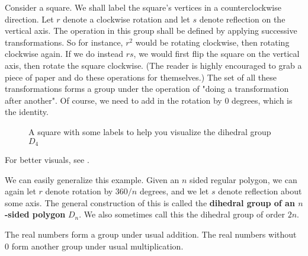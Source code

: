 \documentclass[./main.tex]{subfiles}
\begin{document}
\begin{example}
    Consider a square. We shall label the square's vertices in a
    counterclockwise direction. Let $r$ denote a clockwise rotation and let $s$
    denote reflection on the vertical axis. The operation in this group shall be
    defined by applying successive transformations. So for instance, $r^2$ would
    be rotating clockwise, then rotating clockwise again. If we do instead $rs$,
    we would first flip the square on the vertical axis, then rotate the square
    clockwise. (The reader is highly encouraged to grab a piece of paper and do
    these operations for themselves.) The set of all these transformations forms
    a group under the operation of "doing a transformation after another". Of
    course, we need to add in the rotation by 0 degrees, which is the identity.

    \begin{figure}[h]
        \centering
        \caption{A square with some labels to help you visualize the dihedral group $D_4$}
    \end{figure}

    For better visuals, see \autocite[Fig.~1.1, \pno~28]{Gallian_2020}.

    We can easily generalize this example. Given an $n$ sided regular polygon,
    we can again let $r$ denote rotation by $360/n$ degrees, and we let $s$
    denote reflection about some axis. The general construction of this is
    called the \textbf{dihedral group of an $n$-sided polygon} $D_n$. We also
    sometimes call this the dihedral group of order $2n$.
    
\end{example}

\begin{example}
    The real numbers form a group under usual addition. The real numbers without
    $0$ form another group under usual multiplication.
\end{example}
\end{document}
